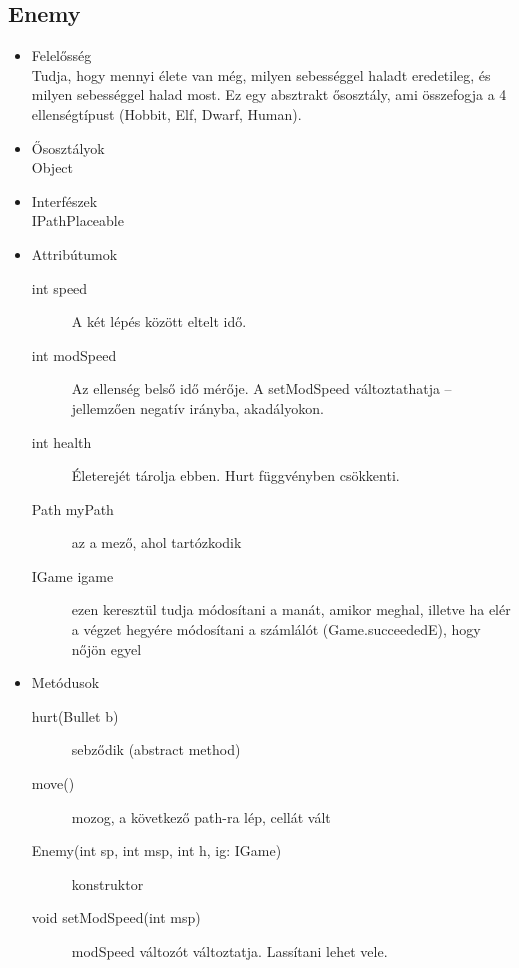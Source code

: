 \subsection{Enemy}
\begin{itemize}
\item Felelősség\\
Tudja, hogy mennyi élete van még, milyen sebességgel haladt eredetileg, és milyen sebességgel halad most. Ez egy absztrakt ősosztály, ami összefogja a 4 ellenségtípust (Hobbit, Elf, Dwarf, Human).
\item Ősosztályok\\
Object
\item Interfészek\\
IPathPlaceable
\item Attribútumok\\
	\begin{description}
		\item[int speed] A két lépés között eltelt idő.
\item[int modSpeed] Az ellenség belső idő mérője. A setModSpeed változtathatja – jellemzően negatív irányba, akadályokon.
\item[int health] Életerejét tárolja ebben. Hurt függvényben csökkenti.
\item[Path myPath] az a mező, ahol tartózkodik
\item[IGame igame] ezen keresztül tudja módosítani a manát, amikor meghal, illetve ha elér a végzet hegyére módosítani a számlálót (Game.succeededE), hogy nőjön egyel

	\end{description}
\item Metódusok\\
	\begin{description}
		\item[hurt(Bullet b)] sebződik (abstract method)
\item[move()] mozog, a következő path-ra lép, cellát vált
\item[Enemy(int sp, int msp, int h, ig: IGame)] konstruktor
\item[void setModSpeed(int msp)] modSpeed változót változtatja. Lassítani lehet vele.

	\end{description}
\end{itemize}


